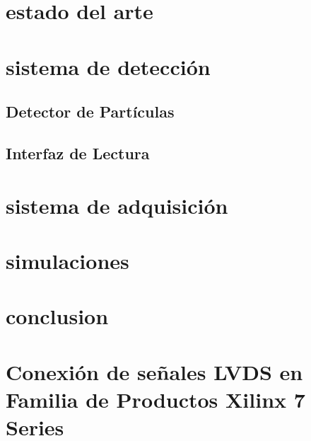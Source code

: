 \documentclass[11pt,letterpaper,oneside]{phstylee}
\begin{document}
\newpage
\thispagestyle{empty}
\cleardoublepage

\chapter{estado del arte}
\label{cap:art}


\newpage
\thispagestyle{empty}
\cleardoublepage

\chapter{sistema de detección}
\label{cap:sdet}


	\section{Detector de Partículas}
	\label{sec:stgc}
	
	
	\section{Interfaz de Lectura}
	\label{sec:asd}
	

\newpage
\thispagestyle{empty}
\cleardoublepage

\chapter{sistema de adquisición}
\label{cap:sadq}


\newpage
\thispagestyle{empty}
\cleardoublepage

\chapter{simulaciones}
\label{cap:sim}


\newpage
\thispagestyle{empty}
\cleardoublepage

\chapter{conclusion}
\label{cap:conclusiones}


\newpage
\thispagestyle{empty}
\cleardoublepage



\appendix
\chapter{Conexión de señales LVDS en Familia de Productos Xilinx 7 Series}
\label{cap:lvds}

\end{document}

